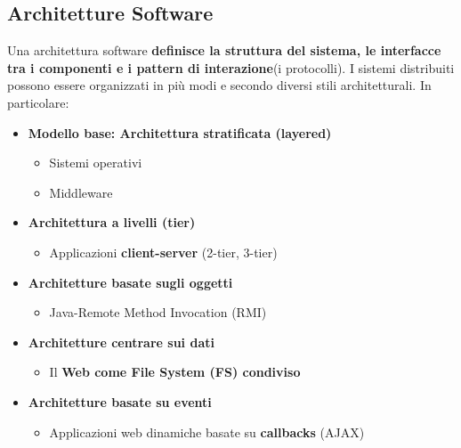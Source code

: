 \documentclass[12pt]{article}
\begin{document}
\subsection{Architetture Software}
Una architettura software \textbf{definisce la struttura del sistema, le interfacce tra i componenti e i pattern di interazione}(i protocolli). I sistemi distribuiti possono essere organizzati in più modi e secondo diversi stili architetturali. In particolare:
\begin{itemize}
    \item \textbf{Modello base: Architettura stratificata (layered)}
          \begin{itemize}
              \item Sistemi operativi
              \item Middleware
          \end{itemize}
    \item \textbf{Architettura a livelli (tier)}
          \begin{itemize}
              \item Applicazioni \textbf{client-server} (2-tier, 3-tier)
          \end{itemize}
    \item \textbf{Architetture basate sugli oggetti}
          \begin{itemize}
              \item Java-Remote Method Invocation (RMI)
          \end{itemize}
    \item \textbf{Architetture centrare sui dati}
          \begin{itemize}
              \item Il \textbf{Web come File System (FS) condiviso}
          \end{itemize}
    \item \textbf{Architetture basate su eventi}
          \begin{itemize}
              \item Applicazioni web dinamiche basate su \textbf{callbacks} (AJAX)
          \end{itemize}
\end{itemize}
\end{document}
